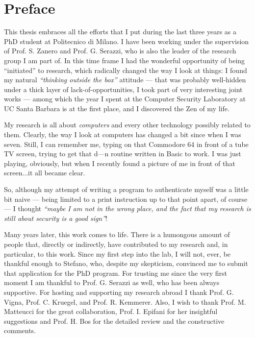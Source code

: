 \section*{Preface}
This thesis embraces all the efforts that I put during the last three
years as a PhD student at Politecnico di Milano. I have been working
under the supervision of Prof. S. Zanero and Prof. G. Serazzi, who is
also the leader of the research group I am part of. In this time frame
I had the wonderful opportunity of being ``initiated'' to research,
which radically changed the way I look at things: I found my natural
\emph{``thinking outside the box''} attitude --- that was probably
well-hidden under a thick layer of lack-of-opportunities, I took part
of very interesting joint works --- among which the year I spent at
the Computer Security Laboratory at UC Santa Barbara is at the first
place, and I discovered the Zen of my life.

My research is all about \emph{computers} and every other technology
possibly related to them. Clearly, the way I look at computers has
changed a bit since when I was seven. Still, I can remember me, typing
on that \textsf{Commodore} 64 in front of a tube TV screen, trying to
get that d---n routine written in \textsf{Basic} to work. I was just
playing, obviously, but when I recently found a picture of me in front
of that screen...it all became clear.



So, although my attempt of writing a program to authenticate myself
was a little bit naive --- being limited to a print instruction up to
that point apart, of course --- I thought \emph{``maybe I am not in
  the wrong place, and the fact that my research is still about
  security is a good sign''}!

Many years later, this work comes to life. There is a humongous amount
of people that, directly or indirectly, have contributed to my
research and, in particular, to this work. Since my first step into
the lab, I will not, ever, be thankful enough to Stefano, who, despite
my skepticism, convinced me to submit that application for the PhD
program. For trusting me since the very first moment I am thankful to
Prof. G. Serazzi as well, who has been always supportive. For hosting
and supporting my research abroad I thank Prof. G. Vigna,
Prof. C. Kruegel, and Prof. R. Kemmerer. Also, I wish to thank
Prof. M. Matteucci for the great collaboration, Prof. I. Epifani
for her insightful suggestions and Prof. H. Bos for the detailed
review and the constructive comments.

